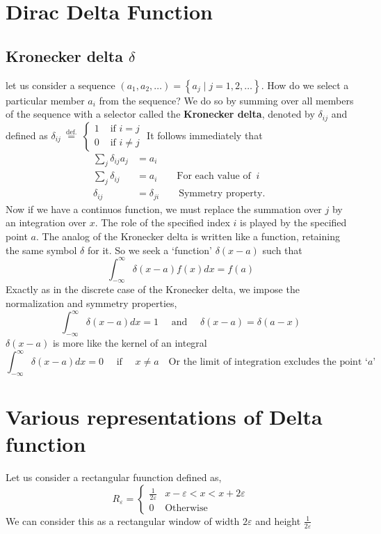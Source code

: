 \section{Dirac Delta Function}
\subsection{Kronecker delta $\delta$}
let us consider a sequence $\left(a_{1}, a_{2}, \ldots\right)=\left\{a_{j} \mid j=1,2, \ldots\right\} .$ How do we select a particular member $a_{i}$ from the sequence? We do so by summing over all members of the sequence with a selector called the \textbf{Kronecker delta}, denoted by $\delta_{i j}$ and defined as
$\delta_{i j} \stackrel{\text { def. }}{=}\left\{\begin{array}{ll}1 & \text { if } i=j \\ 0 & \text { if } i \neq j\end{array}\right.$
It follows immediately that
\begin{align*}
\sum_{j} \delta_{i j} a_{j}&=a_{i}\\
\sum_{j} \delta_{i j}&=a_{i}\qquad \text{For each value of } \ i\\
\delta_{i j}&=\delta_{j i} \qquad \text{Symmetry property. }
\end{align*}
Now if  we have a continuos function, we must replace the summation over  $j$ by an integration over $x$. The role of the specified index $i$ is played by the specified point $a$. The analog of the Kronecker delta is written like a function, retaining the same symbol $\delta$ for it. So we seek a `function' $\delta\left(x-a\right)$ such that
\begin{equation}
\int_{-\infty}^{\infty}  \delta\left(x-a\right) f(x) d x=f\left(a\right)
\end{equation}
Exactly as in the discrete case of the Kronecker delta, we impose the normalization and symmetry properties,
\begin{equation}
\int_{-\infty}^{\infty} \delta\left(x-a\right) d x=1 \quad \text { and } \quad \delta\left(x-a\right)=\delta\left(a-x\right)
\end{equation}
 $\delta\left(x-a\right)$ is more like the kernel of an integral
 \begin{equation}
 \int_{-\infty}^{\infty} \delta\left(x-a\right) d x=0 \quad \text { if } \quad x \neq a \quad \text{Or the limit of integration excludes the point `$a$'} 
 \end{equation}
 \section{Various representations of Delta function}
 Let us consider a rectangular fuunction defined as,
 \begin{equation}
R_{\varepsilon} =\left\{\begin{array}{ll} \frac{1}{2\varepsilon} & x-\varepsilon < x< x+2\varepsilon \\ 0 & \text{Otherwise }\end{array}\right. 
 \end{equation} 
 We can consider  this as a rectangular window of width $2\varepsilon$ and height $\frac{1}{2\varepsilon}$

